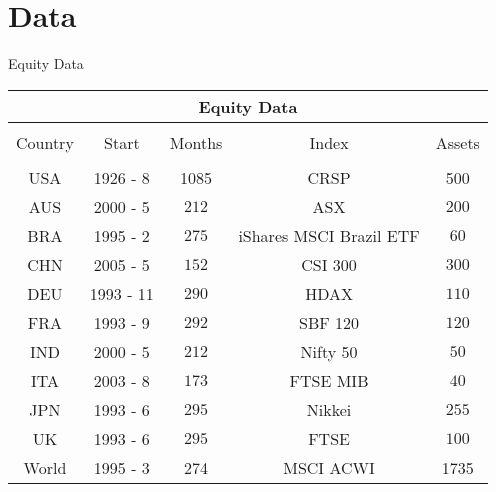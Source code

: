 \documentclass{beamer}
\begin{document}
\section{Data}
\begin{frame}{Equity Data}
	\begin{adjustbox}{width=\textwidth}
		\begin{tabular}{ccccc}
			\multicolumn{5}{c}{Equity Data}\\
			\hline \hline \\[-1.8ex] 
			Country & Start & Months & Index & Assets\\
			\hline\\[-1.8ex]
			USA & 1926 - 8 & 1085 & CRSP & 500\\
			AUS & 2000 - 5 & $212$& ASX & $200$ \\ 
			BRA & 1995 - 2 & $275$& iShares MSCI Brazil ETF& $60$ \\ 
			CHN & 2005 - 5 & $152$& CSI 300& $300$ \\ 
			DEU & 1993 - 11 & $290$& HDAX& $110$ \\
			FRA & 1993 - 9 & $292$& SBF 120& $120$ \\ 
			IND & 2000 - 5 & $212$& Nifty 50& $50$ \\ 
			ITA & 2003 - 8 & $173$& FTSE MIB& $40$ \\ 
			JPN & 1993 - 6 & $295$& Nikkei& $255$ \\ 
			UK & 1993 - 6 & $295$& FTSE& $100$ \\ 
			World & 1995 - 3 & 274 & MSCI ACWI & 1735\\
			\hline
		\end{tabular}
	\end{adjustbox}
\end{frame}
\end{document}

